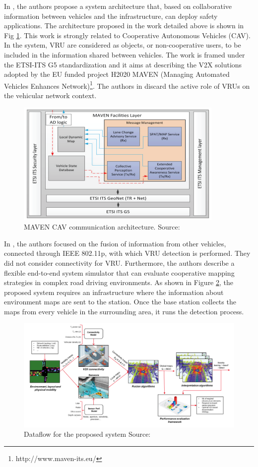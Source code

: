 In \cite{Rondinone2018}, the authors propose a system architecture that, based on collaborative information between vehicles and the infrastructure, can deploy safety applications. The architecture proposed in the work detailed above is shown in Fig \ref{fig:Rond}. This work is strongly related to Cooperative Autonomous Vehicles (CAV). In the system, VRU are considered as objects, or non-cooperative users, to be included in the information shared between vehicles. The work is framed under the ETSI-ITS G5 standardization and it aims at describing the V2X solutions adopted by the EU funded project H2020 MAVEN (Managing Automated Vehicles Enhances Network)\footnote{http://www.maven-its.eu/}. The authors in \cite{Rondinone2018} discard the active role of VRUs on the vehicular network context. 

\begin{figure}[ht!]
    \centering
    \includegraphics[width=10cm]{FIGURES/Fig2.png}
    \caption{MAVEN CAV communication architecture. Source: \cite{Rondinone2018}}
    \label{fig:Rond}
\end{figure}

In \cite{DaSilva2019}, the authors focused on the fusion of information from other vehicles, connected through IEEE 802.11p, with which VRU detection is performed. They did not consider connectivity for VRU. Furthermore, the authors describe a flexible end-to-end system simulator that can evaluate cooperative mapping strategies in complex road driving environments. As shown in Figure \ref{fig:DaS}, the proposed system requires an infrastructure where the information about environment maps are sent to the station. Once the base station collects the maps from every vehicle in the surrounding area, it runs the detection process.

\begin{figure}[ht!]
    \centering
    \includegraphics[width=15cm]{FIGURES/Figura5.png}
    \caption{Dataflow for the proposed system Source: \cite{DaSilva2019}}
    \label{fig:DaS}
\end{figure}

